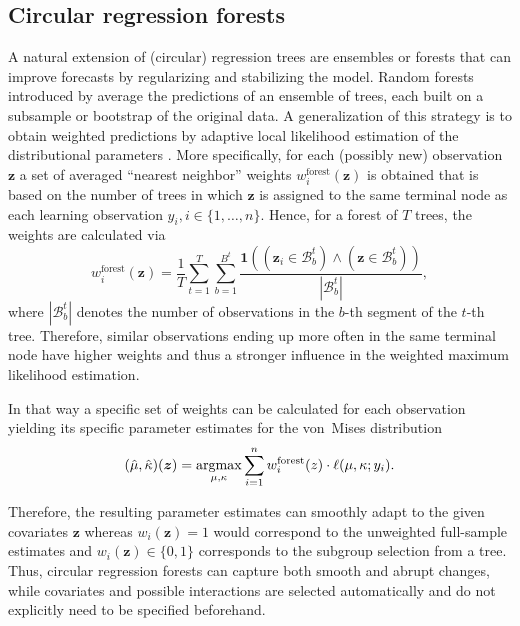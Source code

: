 \documentclass{statsoc}
\begin{document}
\subsection{Circular regression forests}
\label{sec:circforest} 
A natural extension of (circular) regression trees are ensembles or forests
that can improve forecasts by regularizing and stabilizing the model. Random
forests introduced by \cite{Breiman:2001} average the predictions of an
ensemble of trees, each built on a subsample or bootstrap of the original data.
A generalization of this strategy is to obtain weighted predictions by adaptive
local likelihood estimation of the distributional parameters
\citep[Section~2.3. of][]{Schlosser+Hothorn+Stauffer:2019,
Hothorn+Zeileis:2017}. More specifically, for each (possibly new)
observation~$\bm{z}$ a set of averaged ``nearest neighbor'' weights
$w_i^\text{forest}(\bm{z})$ is obtained that is based on the number of trees in
which $\bm{z}$ is assigned to the same terminal node as each learning
observation $y_i, i \in \{1,\ldots,n\}$. Hence, for a forest of $T$ trees, the
weights are calculated via
\begin{equation}
  w^{\text{forest}}_i(\bm{z}) = \frac{1}{T} \sum_{t=1}^T \sum_{b=1}^{B^t}
  \frac{\mathbf{1}((\bm{z}_i \in \mathcal{B}^t_b) \land (\bm{z} \in \mathcal{B}^t_b))}{|\mathcal{B}^t_b|},
\end{equation}
where $|\mathcal{B}^t_b|$ denotes the number of observations in the $b$-th
segment of the $t$-th tree. Therefore, similar observations ending up more
often in the same terminal node have higher weights and thus a stronger
influence in the weighted maximum likelihood estimation.

In that way a specific set of weights can be calculated for each observation
yielding its specific parameter estimates for the von~Mises distribution
\begin{equation}
  (\hat{\mu},\hat{\kappa})(\bm{z}) = \operatorname{argmax}\displaylimits_{\mu,
  \kappa} \sum_{i=1}^n w_i^\text{forest}(z) \cdot \ell(\mu, \kappa; y_i). 
\end{equation}

Therefore, the resulting parameter estimates can smoothly adapt to the given
covariates $\bm{z}$ whereas $w_i(\bm{z}) = 1$ would correspond to the
unweighted full-sample estimates and $w_i(\bm{z}) \in \{0, 1\}$ corresponds to
the subgroup selection from a tree. Thus, circular regression forests can
capture both smooth and abrupt changes, while covariates and possible
interactions are selected automatically and do not explicitly need to be
specified beforehand.
\end{document}
